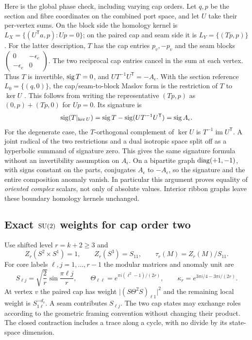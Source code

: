 Here is the global phase check, including varying cap orders. Let
\(q,p\) be the section and fibre coordinates on the combined port
space, and let \(U\) take their per-vertex sums. On the block side the
homology kernel is
\(L_X=\{(U^{\mathsf T}a,p):Up=0\}\); on the paired cap and seam side
it is \(L_Y=\{(Tp,p)\}\). For the latter description, \(T\) has the cap
entries \(p_v,-p_v\) and the seam blocks
\(\left(\begin{smallmatrix}0&-\epsilon_e\\-\epsilon_e&0\end{smallmatrix}\right)\).
The two reciprocal cap entries cancel in the sum at each vertex.
Thus \(T\) is invertible, \(\operatorname{sig} T=0\), and \(UT^{-1}U^{\mathsf T}=-A_\epsilon\).
With the section reference \(L_0=\{(q,0)\}\), the cap/seam-to-block
Maslov form is the restriction of \(T\) to \(\ker U\)
\cite{GM,P50B}. This follows from writing the representative
\((Tp,p)\) as \((0,p)+(Tp,0)\) for \(Up=0\). Its signature is
\[
 \operatorname{sig}(T|_{\ker U})=\operatorname{sig} T-\operatorname{sig}(UT^{-1}U^{\mathsf T})=\operatorname{sig} A_\epsilon .
\]
For the degenerate case, the \(T\)-orthogonal complement of \(\ker U\)
is \(T^{-1}\operatorname{im}U^{\mathsf T}\). A joint radical of the two
restrictions and a dual isotropic space split off as a hyperbolic
summand of signature zero. This gives the same signature formula
without an invertibility assumption on \(A_\epsilon\).
On a bipartite graph \(\operatorname{diag}(+1,-1)\), with signs constant on the
parts, conjugates \(A_\epsilon\) to \(-A_\epsilon\), so the signature
and the entire composition anomaly vanish. In particular this
argument proves equality of \emph{oriented complex} scalars, not only
of absolute values. Interior ribbon graphs leave these boundary
homology kernels unchanged.

\subsection{Exact \texorpdfstring{\(\mathrm{SU}(2)\)}{SU(2)} weights for cap order two}\label{sec:weights}

Use shifted level \(r=k+2\ge3\) and
\[
 Z_r(S^2\times S^1)=1,\qquad Z_r(S^3)=S_{11},\qquad
 \tau_r(M)=Z_r(M)/S_{11}.
\]
For core labels \(\ell,j=1,\ldots,r-1\) the modular matrices and
anomaly unit are
\[
 S_{\ell j}=\sqrt{\frac2r}\sin\frac{\pi\ell j}{r},\qquad
 \Theta_{\ell\ell}=e^{\pi i(\ell^2-1)/(2r)},\qquad
 \kappa_r=e^{3\pi i/4-3\pi i/(2r)}.
\]
At vertex \(v\) the paired cap has weight
\(\big|(S\Theta^2 S)_{\ell1}\big|^2\) and the remaining local weight
is \(S_{1\ell}^{-d_v}\). A seam contributes \(S_{\ell j}\).
The two cap states may exchange roles according to the geometric
framing convention without changing their product. The closed
contraction includes a trace along a cycle, with no divide by its
state-space dimension.

